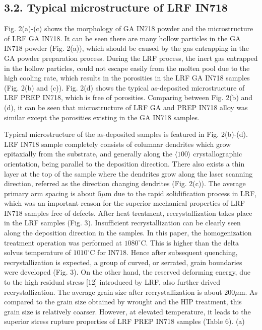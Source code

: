 \documentclass[10pt]{article}
\begin{document}
\subsection*{3.2. Typical microstructure of LRF IN718}
Fig. 2(a)-(c) shows the morphology of GA IN718 powder and the microstructure of LRF GA IN718. It can be seen there are many hollow particles in the GA IN718 powder (Fig. 2(a)), which should be caused by the gas entrapping in the GA powder preparation process. During the LRF process, the inert gas entrapped in the hollow particles, could not escape easily from the molten pool due to the high cooling rate, which results in the porosities in the LRF GA IN718 samples (Fig. 2(b) and (c)). Fig. 2(d) shows the typical as-deposited microstructure of LRF PREP IN718, which is free of porosities. Comparing between Fig. 2(b) and (d), it can be seen that microstructure of LRF GA and PREP IN718 alloy was similar except the porosities existing in the GA IN718 samples.

Typical microstructure of the as-deposited samples is featured in Fig. 2(b)-(d). LRF IN718 sample completely consists of columnar dendrites which grow epitaxially from the substrate, and generally along the $\langle 100\rangle$ crystallographic orientation, being parallel to the deposition direction. There also exists a thin layer at the top of the sample where the dendrites grow along the laser scanning direction, referred as the direction changing dendrites (Fig. 2(c)). The average primary arm spacing is about $5 \mu \mathrm{m}$ due to the rapid solidification process in LRF, which was an important reason for the superior mechanical properties of LRF IN718 samples free of defects. After heat treatment, recrystallization takes place in the LRF samples (Fig. 3). Insufficient recrystallization can be clearly seen along the deposition direction in the samples. In this paper, the homogenization treatment operation was performed at $1080^{\circ} \mathrm{C}$. This is higher than the delta solvus temperature of $1010^{\circ} \mathrm{C}$ for IN718. Hence after subsequent quenching, recrystallization is expected, a group of curved, or serrated, grain boundaries were developed (Fig. 3). On the other hand, the reserved deforming energy, due to the high residual stress [12] introduced by LRF, also further drived recrystallization. The average grain size after recrystallization is about $200 \mu \mathrm{m}$. As compared to the grain size obtained by wrought and the HIP treatment, this grain size is relatively coarser. However, at elevated temperature, it leads to the superior stress rupture properties of LRF PREP IN718 samples (Table 6). (a)
\end{document}
